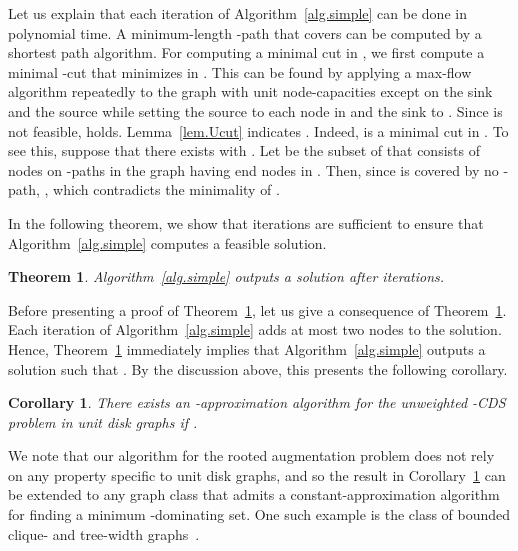 \documentclass[11pt]{article}
\newtheorem{theorem}{Theorem}
\newtheorem{corollary}{Corollary}
\begin{document}
 Let us explain that each iteration of Algorithm~\ref{alg.simple} can be done in polynomial time.
 A minimum-length -path  that covers 
 can be computed by a shortest path algorithm.
 For computing a minimal cut in ,
 we first compute a minimal -cut  that minimizes
  in . This can be found by applying 
 a max-flow algorithm repeatedly to the graph  with unit
 node-capacities except on the sink and the source
 while setting the source to each node in  and the sink to .
 Since  is not feasible,  holds.
 Lemma~\ref{lem.Ucut} indicates .
 Indeed,  is a minimal cut in . To see this, 
 suppose that there exists  with .
 Let  be the subset of  that consists of nodes on
 -paths  in the graph  having end nodes in . Then, since  is 
 covered by no -path, , which
 contradicts the minimality of .
 
 
 
In the following theorem, we show that  iterations are sufficient to ensure that
Algorithm~\ref{alg.simple} computes a feasible solution.

 \begin{theorem}
  \label{thm.simple-alg}
 Algorithm~\ref{alg.simple} 
  outputs a solution after  iterations.
 \end{theorem}

Before presenting a proof of Theorem~\ref{thm.simple-alg},
let us give a consequence of Theorem~\ref{thm.simple-alg}.
Each iteration of
 Algorithm~\ref{alg.simple} adds at most two nodes to the solution.
 Hence, Theorem~\ref{thm.simple-alg} immediately implies
 that
 Algorithm~\ref{alg.simple} outputs a solution  such that .
 By the discussion above, this presents the following corollary.

   \begin{corollary}\label{cor.unweighted}
    There exists an -approximation algorithm for 
    the unweighted -CDS problem in unit disk graphs
    if .
   \end{corollary}

   We note that our algorithm for the rooted augmentation problem
   does not rely on any property specific to unit disk graphs, and so
  the result in Corollary~\ref{cor.unweighted}
   can be extended to any graph class that admits a 
   constant-approximation algorithm for
   finding a minimum -dominating set.
   One such example
   is the class of 
   bounded clique- and tree-width graphs~\cite{CicaleseCGMV14}.
   
\end{document}
